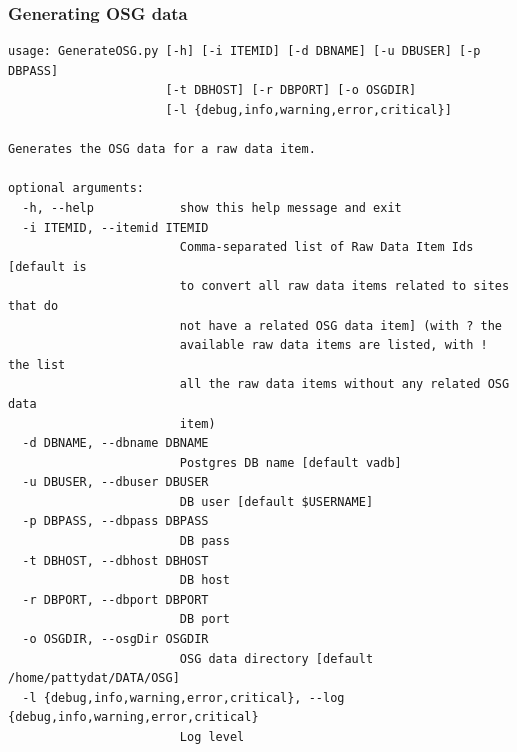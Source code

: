 \subsubsection{Generating OSG data}
\label{sec:generateosg}
\begin{Verbatim}[fontfamily=courier,commandchars=\\\{\},fontsize=\footnotesize]
 usage: GenerateOSG.py [-h] [-i ITEMID] [-d DBNAME] [-u DBUSER] [-p DBPASS]
                      [-t DBHOST] [-r DBPORT] [-o OSGDIR]
                      [-l {debug,info,warning,error,critical}]

Generates the OSG data for a raw data item.

optional arguments:
  -h, --help            show this help message and exit
  -i ITEMID, --itemid ITEMID
                        Comma-separated list of Raw Data Item Ids [default is
                        to convert all raw data items related to sites that do
                        not have a related OSG data item] (with ? the
                        available raw data items are listed, with ! the list
                        all the raw data items without any related OSG data
                        item)
  -d DBNAME, --dbname DBNAME
                        Postgres DB name [default vadb]
  -u DBUSER, --dbuser DBUSER
                        DB user [default $USERNAME]
  -p DBPASS, --dbpass DBPASS
                        DB pass
  -t DBHOST, --dbhost DBHOST
                        DB host
  -r DBPORT, --dbport DBPORT
                        DB port
  -o OSGDIR, --osgDir OSGDIR
                        OSG data directory [default /home/pattydat/DATA/OSG]
  -l {debug,info,warning,error,critical}, --log {debug,info,warning,error,critical}
                        Log level
\end{Verbatim}

